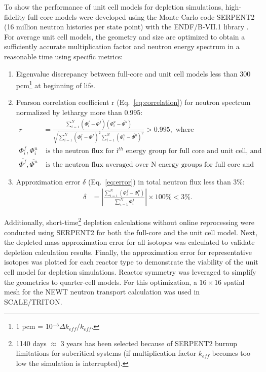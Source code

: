 \documentclass[letterpaper]{mandc2019}
\newcommand{\abs}[1]{\left\lvert #1 \right\rvert}
\begin{document}
To show the performance of unit cell models for depletion simulations, high-fidelity full-core models were developed using the Monte Carlo code SERPENT2 (16 million neutron histories per state point) with the ENDF/B-VII.1 library \cite{leppanen_serpent_2015, chadwick_endf/b-vii.1_2011}. 
For average unit cell models, the geometry and size are optimized to obtain a sufficiently accurate multiplication factor and neutron energy spectrum in a reasonable time using specific metrics:
\begin{enumerate}
	\item Eigenvalue discrepancy between full-core and unit cell models less than 300 pcm\footnote{ 1 pcm = 10$^{-5}\Delta k_{eff}/k_{eff}$.} at beginning of life.\vspace{-0.1in}
	\item Pearson correlation coefficient r (Eq.~\ref{eq:correlation}) for neutron spectrum normalized by lethargy more than 0.995:
\begin{align}
r &= \frac{\sum_{i=1}^{N} (\Phi_i^f-\overline{\Phi^f})(\Phi_i^u-\overline{\Phi^u})}
		  {\sqrt{\sum_{i=1}^{N} (\Phi_i^f-\overline{\Phi^f})^2 \sum_{i=1}^{N} (\Phi_i^u-\overline{\Phi^u})^2}} > 0.995 \label{eq:correlation}, \mbox{ where} \\
\Phi_i^f,\Phi_i^u & \mbox{ is the neutron flux for i$^{th}$ energy group for full core and unit cell, and} \nonumber\\
\overline{\Phi^f}, \overline{\Phi^u} & \mbox{ is the neutron flux averaged over N energy groups for full core and unit cell.} \nonumber
\end{align}		\vspace{-0.3in}
	\item Approximation error $\delta$ (Eq.~\ref{eq:error})  in total neutron flux less than 3\%:
\begin{align}
\delta &= \abs{\frac{\sum_{i=1}^{N} (\Phi_i^f-\Phi_i^u)}
{\sum_{i=1}^{N} \Phi_i^f}} \times 100\% < 3\%. \label{eq:error}
\end{align}	
	\vspace{-0.4in}
\end{enumerate}

Additionally, short-time\footnote{1140 days $\approx$ 3 years has been selected because of SERPENT2 burnup limitations for subcritical systems (if multiplication factor $k_{eff}$ becomes too low the simulation is interrupted).} depletion calculations without online reprocessing were conducted using SERPENT2 for both the full-core and the unit cell model. 
Next, the depleted mass approximation error for all isotopes was calculated to validate depletion calculation results. 
Finally, the approximation error for representative isotopes was plotted for each reactor type to demonstrate the viability of the unit cell model for depletion simulations. 
Reactor symmetry was leveraged to simplify the geometries to quarter-cell models. 
For this optimization, a $16\times 16$ spatial mesh for the NEWT neutron transport calculation was used in SCALE/TRITON.
\end{document}
